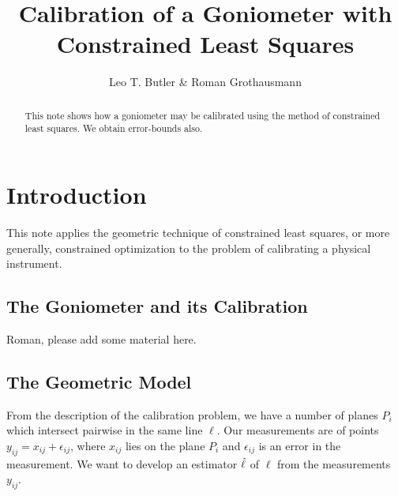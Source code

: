 \documentclass[a4paper,reqno]{amsart}
\title[Goniometer]{Calibration of a Goniometer with Constrained Least
  Squares}
\author{Leo T. Butler \& Roman Grothausmann}
\begin{document}
\begin{abstract}
  This note shows how a goniometer may be calibrated using the method
  of constrained least squares. We obtain error-bounds also.
\end{abstract}
\maketitle

\section{Introduction}
\label{sec:intro}

This note applies the geometric technique of constrained least
squares, or more generally, constrained optimization to the problem of
calibrating a physical instrument.

\subsection{The Goniometer and its Calibration}
\label{sec:goniometer-intro}
\begin{acomment}[notdone]
  Roman, please add some material here.
\end{acomment}


\subsection{The Geometric Model}
\label{sec:geometric-model}

From the description of the calibration problem, we have a number of
planes $P_i$ which intersect pairwise in the same line $\ell$. Our
measurements are of points $y_{ij}=x_{ij}+\epsilon_{ij}$, where
$x_{ij}$ lies on the plane $P_i$ and $\epsilon_{ij}$ is an error in
the measurement. We want to develop an estimator $\hat{\ell}$ of
$\ell$ from the measurements $y_{ij}$.
\end{document}

